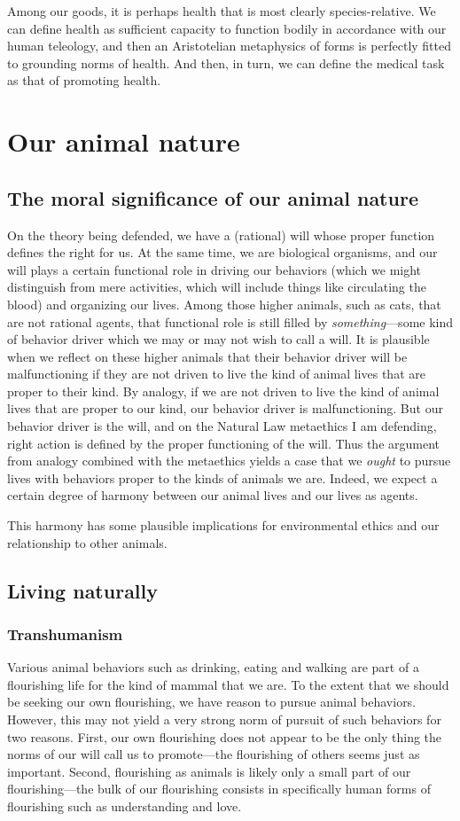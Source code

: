 Among our goods, it is perhaps health that is most clearly species-relative. 
We can define health as sufficient capacity to function bodily in accordance with our human teleology, and then
an Aristotelian metaphysics of forms is perfectly fitted to grounding norms of health. And then, in turn, we can
define the medical task as that of promoting health.

\section{Our animal nature}
\subsection{The moral significance of our animal nature}
On the theory being defended, we have a (rational) will whose proper function defines the right for us. At the same time, 
we are biological organisms, and our will plays a certain functional role in driving our behaviors (which we might
distinguish from mere activities, which will include things like circulating the blood)
and organizing our 
lives. Among those higher animals, such as cats, that are not rational agents, that functional role is still filled by 
\textit{something}---some kind of behavior driver which we may or may not wish to call a will. It is plausible when 
we reflect on these higher animals that their behavior driver will be malfunctioning if they are not driven to live the kind
of animal lives that are proper to their kind. By analogy, if we are not driven to live the kind of animal lives
that are proper to our kind, our behavior driver is malfunctioning. But our behavior driver is the will, and on the Natural Law
metaethics I am defending, right action is defined by the proper functioning of the will. Thus the argument from analogy combined
with the metaethics yields a case that we \textit{ought} to pursue lives with behaviors proper to the kinds of animals we are. Indeed, we expect
a certain degree of harmony between our animal lives and our lives as agents.

This harmony has some plausible implications for environmental ethics and our relationship to other animals. 

\subsection{Living naturally}
\subsubsection{Transhumanism}
Various animal behaviors such as drinking, eating and walking are part of a flourishing life for the kind of mammal 
that we are. To the extent that we should be seeking our own flourishing, we have reason to pursue animal behaviors. However,
this may not yield a very strong norm of pursuit of such behaviors for two reasons. First, our own flourishing does not appear
to be the only thing the norms of our will call us to promote---the flourishing of others seems just as 
important.
Second, flourishing as animals is likely only a small part of our flourishing---the bulk of our flourishing consists in specifically
human forms of flourishing such as understanding and love. 

